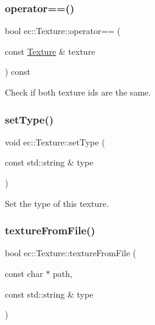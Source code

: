 \mbox{\label{classec_1_1_texture_ab00e335380881f3267732186381c777c}} 
\subsubsection{\texorpdfstring{operator==()}{operator==()}}
{\footnotesize\ttfamily bool ec\+::\+Texture\+::operator== (\begin{DoxyParamCaption}\item[{const \mbox{\hyperlink{classec_1_1_texture}{Texture}} \&}]{texture }\end{DoxyParamCaption}) const}



Check if both texture ids are the same. 

\mbox{\label{classec_1_1_texture_a4d984f43478753facd81186d1cd36bcb}} 
\subsubsection{\texorpdfstring{set\+Type()}{setType()}}
{\footnotesize\ttfamily void ec\+::\+Texture\+::set\+Type (\begin{DoxyParamCaption}\item[{const std\+::string \&}]{type }\end{DoxyParamCaption})}



Set the type of this texture. 

\mbox{\label{classec_1_1_texture_ac2461a696b914d1b22192a87d326f480}} 
\subsubsection{\texorpdfstring{texture\+From\+File()}{textureFromFile()}}
{\footnotesize\ttfamily bool ec\+::\+Texture\+::texture\+From\+File (\begin{DoxyParamCaption}\item[{const char $\ast$}]{path,  }\item[{const std\+::string \&}]{type }\end{DoxyParamCaption})}



